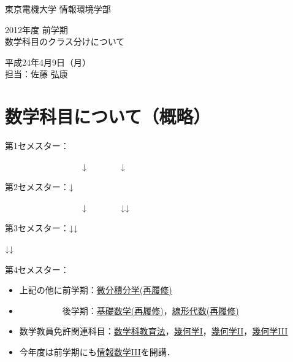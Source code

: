 \documentclass[a4j,landscape,25pt]{jsarticle}
\begin{document}
\thispagestyle{empty}
\vspace*{30pt}
\begin{center}
{\small 東京電機大学 情報環境学部}
\vspace{15pt}

{\large 2012年度 前学期\\数学科目のクラス分けについて}
\vspace{45pt}

{\footnotesize 
平成24年4月9日（月）\\
担当：佐藤 弘康
}
\end{center}

\section{数学科目について（概略）}
\noindent 第1セメスター：\fbox{\color{blue}{基礎数学}}\quad\fbox{\color{blue}{線形代数}}

　　　　　　　　　↓　　　　\hspace{3.5pt}↓

\noindent 第2セメスター：\fbox{\color{blue}{微分積分学}}\hspace{4pt}\quad↓\hspace{37pt}\fbox{\color{blue}{確率統計}}\hspace{37pt}

　　　　　　　　　↓　　　　\hspace{3pt}↓\hspace{150pt}↓

\noindent 第3セメスター：\hspace{17pt}↓\hspace{17pt}\quad{}\hspace{17pt}↓

\hspace{132pt}↓\hspace{150.5pt}↓

\noindent 第4セメスター：　　　　　\hspace{22pt}\hspace{22pt}
\medskip

\begin{itemize}
\item 上記の他に前学期：\underline{微分積分学(再履修)}
\item 　　　　　後学期：\underline{基礎数学(再履修)}，\underline{線形代数(再履修)}
\item 数学教員免許関連科目：\underline{数学科教育法}，\underline{幾何学I}，\underline{幾何学II}，\underline{幾何学III}
\item 今年度は前学期にも\underline{情報数学III}を開講．
 \end{itemize}
\end{document}
